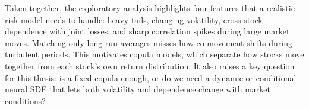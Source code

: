 Taken together, the exploratory analysis highlights four features that a
realistic risk model needs to handle: heavy tails, changing volatility,
cross-stock dependence with joint losses, and sharp correlation spikes during
large market moves. Matching only long-run averages misses how co-movement
shifts during turbulent periods. This motivates copula models, which separate
how stocks move together from each stock's own return distribution. It also
raises a key question for this thesis: is a fixed copula enough, or do we need
a dynamic or conditional neural SDE that lets both volatility and dependence
change with market conditions?
